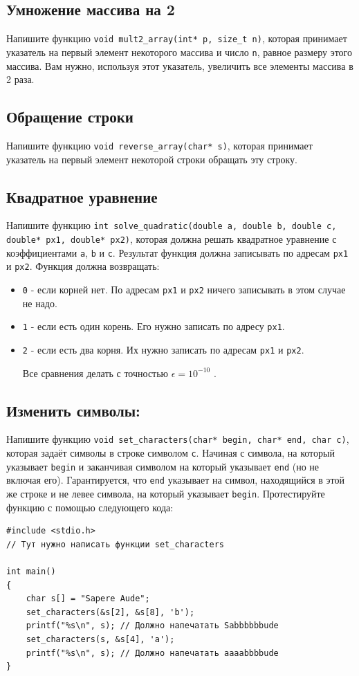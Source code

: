\documentclass{article}
\begin{document}
\subsection{Умножение массива на 2}
Напишите функцию \texttt{void mult2\_array(int* p, size\_t n)}, которая принимает указатель на первый элемент некоторого массива и число \texttt{n}, равное размеру этого массива. Вам нужно, используя этот указатель, увеличить все элементы массива в 2 раза.


\subsection{Обращение строки}
Напишите функцию \texttt{void reverse\_array(char* s)}, которая принимает указатель на первый элемент некоторой строки обращать эту строку.


\subsection{Квадратное уравнение}
Напишите функцию \texttt{int solve\_quadratic(double a, double b, double c, double* px1, double* px2)}, которая должна решать квадратное уравнение с коэффициентами \texttt{a}, \texttt{b} и \texttt{c}. Результат функция должна записывать по адресам \texttt{px1} и \texttt{px2}. Функция должна возвращать:
\begin{itemize}
\item \texttt{0} - если корней нет. По адресам \texttt{px1} и \texttt{px2} ничего записывать в этом случае не надо.
\item \texttt{1} - если есть один корень. Его нужно записать по адресу \texttt{px1}.
\item \texttt{2} - если есть два корня. Их нужно записать по адресам \texttt{px1} и \texttt{px2}.

Все сравнения делать с точностью $\epsilon = 10^{-10}$ .

\end{itemize}

\subsection{Изменить символы:}
Напишите функцию \texttt{void set\_characters(char* begin, char* end, char c)}, которая задаёт символы в строке символом \texttt{c}. Начиная с символа, на который указывает \texttt{begin} и заканчивая символом на который указывает \texttt{end} (но не включая его). Гарантируется, что \texttt{end} указывает на символ, находящийся в этой же строке и не левее символа, на который указывает \texttt{begin}. Протестируйте функцию с помощью следующего кода:
\begin{lstlisting}
#include <stdio.h>
// Тут нужно написать функции set_characters

int main() 
{
    char s[] = "Sapere Aude";
    set_characters(&s[2], &s[8], 'b');
    printf("%s\n", s); // Должно напечатать Sabbbbbbude
    set_characters(s, &s[4], 'a');
    printf("%s\n", s); // Должно напечатать aaaabbbbude
}
\end{lstlisting}
\end{document}
